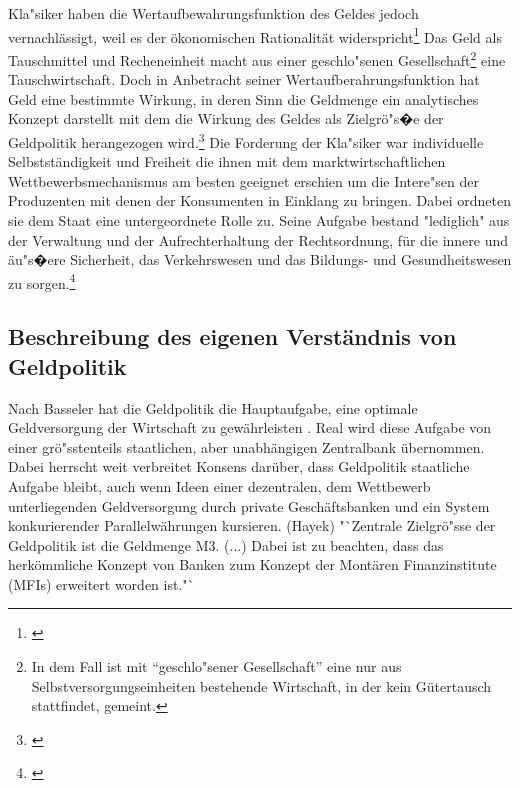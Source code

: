 \documentclass[
        onecolumn,
        a4paper,
        abstracton,
        parskip=half
        ,final
        ]{scrartcl}
\begin{document}
Kla{"s}iker haben die Wertaufbewahrungsfunktion des Geldes jedoch vernachl{\"a}ssigt, weil es der {\"o}konomischen Rationalit{\"a}t widerspricht\footnote[108]{\citep*[S.53]{bombach1981theorie}} Das Geld als Tauschmittel und Recheneinheit macht aus einer geschlo{"s}enen Gesellschaft\footnote[109]{In dem Fall ist mit "`geschlo{"s}ener Gesellschaft"' eine nur aus Selbstversorgungseinheiten bestehende Wirtschaft, in der kein G{\"u}tertausch stattfindet, gemeint.} eine Tauschwirtschaft. Doch in Anbetracht seiner Wertaufberahrungsfunktion hat Geld eine bestimmte Wirkung, in deren Sinn die Geldmenge ein analytisches Konzept darstellt mit dem die Wirkung des Geldes als Zielgr{\"o}{"s}�e der Geldpolitik herangezogen wird.\footnote[110]{\citep*[S.421]{Basseler2010}} Die Forderung der Kla{"s}iker war individuelle Selbstst{\"a}ndigkeit und Freiheit die ihnen mit dem marktwirtschaftlichen Wettbewerbsmechanismus am besten geeignet erschien um die Intere{"s}en der Produzenten mit denen der Konsumenten in Einklang zu bringen. Dabei ordneten sie dem Staat eine untergeordnete Rolle zu. Seine Aufgabe bestand "lediglich" aus der Verwaltung und der Aufrechterhaltung der Rechtsordnung, f{\"u}r die innere und {\"a}u{"s}�ere Sicherheit, das Verkehrswesen und das Bildungs- und Gesundheitswesen zu sorgen.\footnote[111]{\citep*[S.60f]{Basseler2010}}














\subsection{Beschreibung des eigenen Verst{\"a}ndnis von Geldpolitik}
    Nach Basseler hat die Geldpolitik die Hauptaufgabe, eine optimale Geldversorgung der Wirtschaft zu gew{\"a}hrleisten \citep*[vgl.][S. 551]{Basseler2010}.
    Real wird diese Aufgabe von einer gr{\"o}{"ss}tenteils staatlichen, aber unabh{\"a}ngigen Zentralbank {\"u}bernommen. Dabei herrscht weit verbreitet Konsens dar{\"u}ber, dass Geldpolitik staatliche Aufgabe bleibt, auch wenn Ideen einer dezentralen, dem Wettbewerb unterliegenden Geldversorgung durch private Gesch{\"a}ftsbanken und ein System konkurierender Parallelw{\"a}hrungen kursieren. (Hayek)
    "`Zentrale Zielgr{\"o}{"ss}e der Geldpolitik ist die Geldmenge M3. (...) Dabei ist zu beachten, dass das herk{\"o}mmliche Konzept von Banken zum Konzept der Mont{\"a}ren Finanzinstitute (MFIs) erweitert worden ist."`
    \citep*[vgl.][S. 507]{Basseler2010}
\end{document}
